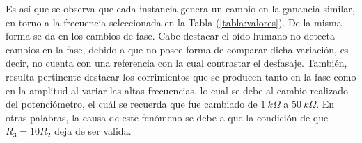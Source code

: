 Es así que se observa que cada instancia genera un cambio en la ganancia similar, en torno a la frecuencia seleccionada en la Tabla (\ref{tabla:valores}). De la misma forma se da en los cambios de fase. Cabe destacar el oído humano no detecta cambios en la fase, debido a que no posee forma de comparar dicha variación, es decir, no cuenta con una referencia con la cual contrastar el desfasaje.
También, resulta pertinente destacar los corrimientos que se producen tanto en la fase como en la amplitud al variar las altas frecuencias, lo cual se debe al cambio realizado del potenciómetro, el cuál se recuerda que fue cambiado de $1 \ k\Omega$ a $50 \ k\Omega$. En otras palabras, la causa de este fenómeno se debe a que la condición de que $R_3 = 10R_2$ deja de ser valida.


